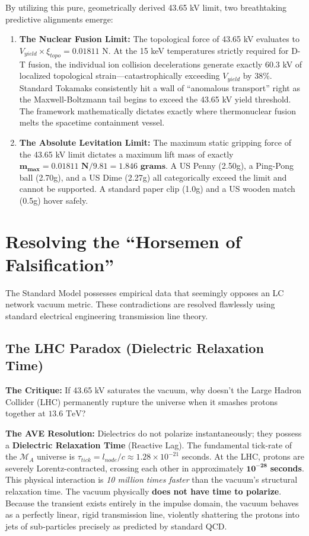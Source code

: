 By utilizing this pure, geometrically derived 43.65 kV limit, two breathtaking predictive alignments emerge:
\begin{enumerate}
    \item \textbf{The Nuclear Fusion Limit:} The topological force of 43.65 kV evaluates to $V_{yield} \times \xi_{topo} = 0.01811$ N. At the 15 keV temperatures strictly required for D-T fusion, the individual ion collision decelerations generate exactly $60.3$ kV of localized topological strain---catastrophically exceeding $V_{yield}$ by 38\%. Standard Tokamaks consistently hit a wall of ``anomalous transport'' right as the Maxwell-Boltzmann tail begins to exceed the 43.65 kV yield threshold. The framework mathematically dictates exactly where thermonuclear fusion melts the spacetime containment vessel.
    \item \textbf{The Absolute Levitation Limit:} The maximum static gripping force of the 43.65 kV limit dictates a maximum lift mass of exactly $\mathbf{m_{max} = 0.01811 \text{ N} / 9.81 = 1.846 \text{ grams}}$. A US Penny (2.50g), a Ping-Pong ball (2.70g), and a US Dime (2.27g) all categorically exceed the limit and cannot be supported. A standard paper clip (1.0g) and a US wooden match (0.5g) hover safely.
\end{enumerate}

\section{Resolving the ``Horsemen of Falsification''}
The Standard Model possesses empirical data that seemingly opposes an LC network vacuum metric. These contradictions are resolved flawlessly using standard electrical engineering transmission line theory.

\subsection{The LHC Paradox (Dielectric Relaxation Time)}
\textbf{The Critique:} If 43.65 kV saturates the vacuum, why doesn't the Large Hadron Collider (LHC) permanently rupture the universe when it smashes protons together at $13.6 \text{ TeV}$? 

\textbf{The AVE Resolution:} Dielectrics do not polarize instantaneously; they possess a \textbf{Dielectric Relaxation Time} (Reactive Lag). The fundamental tick-rate of the $\mathcal{M}_A$ universe is $\tau_{tick} = l_{node} / c \approx 1.28 \times 10^{-21}$ seconds. 
At the LHC, protons are severely Lorentz-contracted, crossing each other in approximately $\mathbf{10^{-28}}$ \textbf{seconds}. This physical interaction is \textit{10 million times faster} than the vacuum's structural relaxation time. 
The vacuum physically \textbf{does not have time to polarize}. Because the transient exists entirely in the impulse domain, the vacuum behaves as a perfectly linear, rigid transmission line, violently shattering the protons into jets of sub-particles precisely as predicted by standard QCD. 

